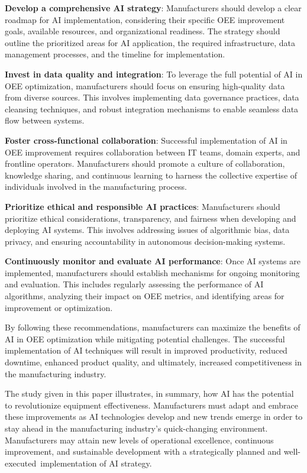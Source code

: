\documentclass[12pt]{article}
\begin{document}
\textbf{Develop a comprehensive AI strategy}: Manufacturers should develop a clear roadmap for AI implementation, considering their specific OEE improvement goals, available resources, and organizational readiness. The strategy should outline the prioritized areas for AI application, the required infrastructure, data management processes, and the timeline for implementation.
\vspace{0.3cm}

\textbf{Invest in data quality and integration}: To leverage the full potential of AI in OEE optimization, manufacturers should focus on ensuring high-quality data from diverse sources. This involves implementing data governance practices, data cleansing techniques, and robust integration mechanisms to enable seamless data flow between systems.
\vspace{0.3cm}

\textbf{Foster cross-functional collaboration}: Successful implementation of AI in OEE improvement requires collaboration between IT teams, domain experts, and frontline operators. Manufacturers should promote a culture of collaboration, knowledge sharing, and continuous learning to harness the collective expertise of individuals involved in the manufacturing process.
\vspace{0.3cm}

\textbf{Prioritize ethical and responsible AI practices}: Manufacturers should prioritize ethical considerations, transparency, and fairness when developing and deploying AI systems. This involves addressing issues of algorithmic bias, data privacy, and ensuring accountability in autonomous decision-making systems.
\vspace{0.3cm}

\textbf{Continuously monitor and evaluate AI performance}: Once AI systems are implemented, manufacturers should establish mechanisms for ongoing monitoring and evaluation. This includes regularly assessing the performance of AI algorithms, analyzing their impact on OEE metrics, and identifying areas for improvement or optimization.
\vspace{0.3cm}

By following these recommendations, manufacturers can maximize the benefits of AI in OEE optimization while mitigating potential challenges. The successful implementation of AI techniques will result in improved productivity, reduced downtime, enhanced product quality, and ultimately, increased competitiveness in the manufacturing industry.

The study given in this paper illustrates, in summary, how AI has the potential to revolutionize equipment effectiveness. Manufacturers must adapt and embrace these improvements as AI technologies develop and new trends emerge in order to stay ahead in the manufacturing industry's quick-changing environment. Manufacturers may attain new levels of operational excellence, continuous improvement, and sustainable development with a strategically planned and well-executed implementation of AI strategy.
\end{document}
